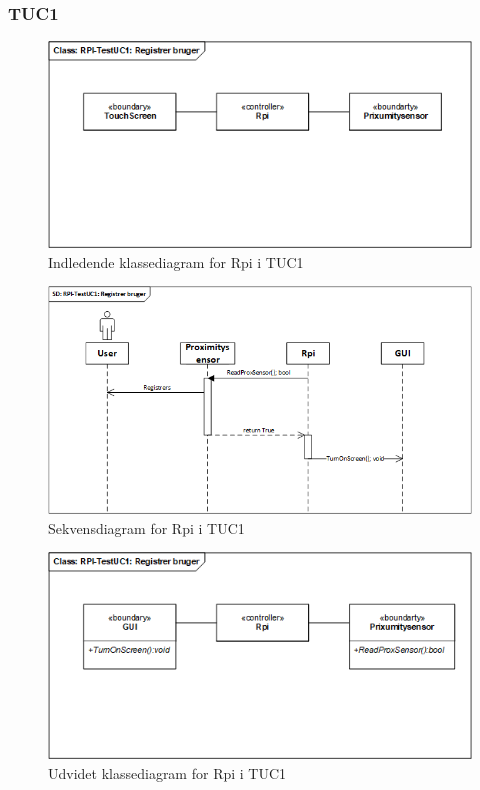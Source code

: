 \subsubsection{TUC1}

\begin{figure}[H]
    \centering
    \includegraphics[width=1\textwidth]{Images/Applikationsmodeller/rpi/rpi_klassediagramTestUC1.png}
    \caption{Indledende klassediagram for Rpi i TUC1}
    \label{fig:cdTUC1Rpi}
\end{figure}

\begin{figure}[H]
    \centering
    \includegraphics[width=1\textwidth]{Images/Applikationsmodeller/rpi/rpi_sekvensdiagramTestUC1.png}
    \caption{Sekvensdiagram for Rpi i TUC1}
    \label{fig:sdTUC1Rpi}
\end{figure}

\begin{figure}[H]
    \centering
    \includegraphics[width=1\textwidth]{Images/Applikationsmodeller/rpi/rpi_UdvidetklassediagramTestUC1.png}
    \caption{Udvidet klassediagram for Rpi i TUC1}
    \label{fig:UcdTUC1Rpi}
\end{figure}

